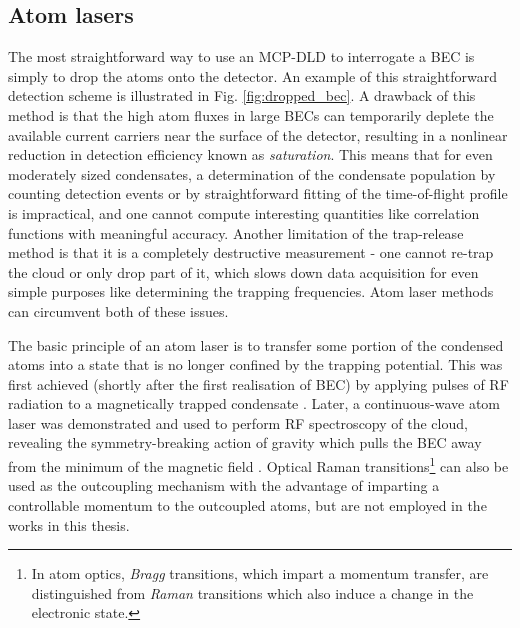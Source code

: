 \subsection*{Atom lasers}



	The most straightforward way to use an MCP-DLD to interrogate a BEC is simply to drop the atoms onto the detector.
	An example of this straightforward detection scheme is illustrated in Fig.
	\ref{fig:dropped_bec}.
	A drawback of this method is that the high atom fluxes in large BECs can temporarily deplete the available current carriers near the surface of the detector, resulting in a nonlinear reduction in detection efficiency known as \emph{saturation}.
	This means that for even moderately sized condensates, a determination of the condensate population by counting detection events or by straightforward fitting of the time-of-flight profile is impractical, and one cannot compute interesting quantities like correlation functions with meaningful accuracy.
	Another limitation of the trap-release method is that it is a completely destructive measurement - one cannot re-trap the cloud or only drop part of it, which slows down data acquisition for even simple purposes like determining the trapping frequencies.
	Atom laser methods can circumvent both of these issues.
	

	The basic principle of an atom laser is to transfer some portion of the condensed atoms into a state that is no longer confined by the trapping potential.
	This was first achieved (shortly after the first realisation of BEC) by applying pulses of RF radiation to a magnetically trapped condensate \cite{Mewes97}.
	Later, a continuous-wave atom laser was demonstrated and used to perform RF spectroscopy of the cloud, revealing the symmetry-breaking action of gravity which pulls the BEC away from the minimum of the magnetic field \cite{Bloch99}.
	Optical Raman transitions\footnote{In atom optics, \emph{Bragg} transitions, which impart a momentum transfer, are distinguished from  \emph{Raman} transitions which also induce a change in the electronic state.} can also be used as the outcoupling mechanism \cite{Hagley99} with the advantage of imparting a controllable momentum to the outcoupled atoms, but are not employed in the works in this thesis.
	

